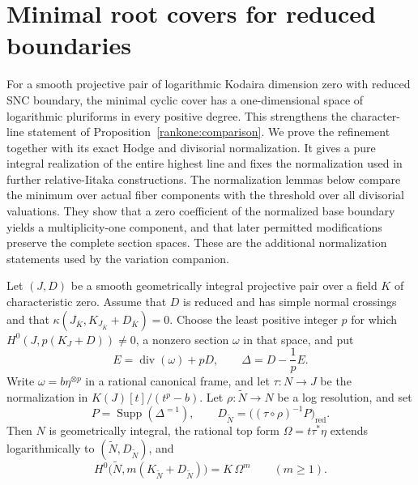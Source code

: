 \section{Minimal root covers for reduced boundaries}\label{cyc:section}

For a smooth projective pair of logarithmic Kodaira dimension zero
with reduced SNC boundary, the minimal cyclic cover has a
one-dimensional space of logarithmic pluriforms in every positive
degree. This strengthens
the character-line statement of Proposition~\ref{rankone:comparison}.
We prove the refinement together with its exact Hodge and divisorial
normalization. It gives a pure integral realization of the entire
highest line and fixes the normalization used in further
relative-Iitaka constructions.
The normalization lemmas below compare the minimum over actual fiber components
with the threshold over all divisorial valuations. They show that a
zero coefficient of the normalized base boundary yields a
multiplicity-one component, and that later permitted modifications
preserve the complete section spaces. These are the additional
normalization statements used by the variation companion.

\begin{lemma}
\label{lem:reduced-cyclic-top}
Let $(J,D)$ be a smooth geometrically integral projective pair over a
field $K$ of characteristic zero. Assume that $D$ is reduced and has
simple normal crossings and that
$\kappa(J_{\overline K},K_{J_{\overline K}}+D_{\overline K})=0$.
Choose the least positive integer $p$ for which
$H^0(J,p(K_J+D))\ne0$, a nonzero section $\omega$ in that space,
and put
\[
 E=\operatorname{div}(\omega)+pD,
 \qquad \Delta=D-\frac1pE.
\]
Write $\omega=b\eta^{\otimes p}$ in a rational canonical frame,
and let $\tau:N\to J$ be the normalization in
$K(J)[t]/(t^p-b)$. Let $\rho:\widetilde N\to N$ be a log
resolution, and set
\[
 P=\operatorname{Supp}(\Delta^{=1}),\qquad
 D_{\widetilde N}=\bigl((\tau\circ\rho)^{-1}P\bigr)_{\mathrm{red}}.
\]
Then $N$ is geometrically integral, the rational top form
$\Omega=t\tau^*\eta$ extends logarithmically to
$(\widetilde N,D_{\widetilde N})$, and
\[
 H^0\bigl(\widetilde N,m(K_{\widetilde N}+D_{\widetilde N})\bigr)
       =K\,\Omega^m\qquad(m\ge1).
\]
\end{lemma}


